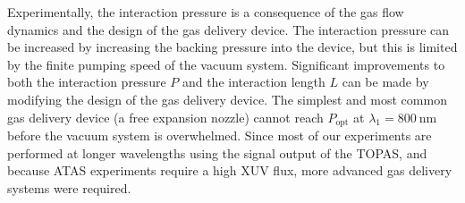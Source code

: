 Experimentally, the interaction pressure is a consequence of the gas flow dynamics and the design of the gas delivery device. The interaction pressure can be increased by increasing the backing pressure into the device, but this is limited by the finite pumping speed of the vacuum system. Significant improvements to both the interaction pressure $P$ and the interaction length $L$ can be made by modifying the design of the gas delivery device. The simplest and most common gas delivery device (a free expansion nozzle) cannot reach $P_{\textrm{opt}}$ at $\lambda_1 = 800 \ \textrm{nm}$ before the vacuum system is overwhelmed. Since most of our experiments are performed at longer wavelengths using the signal output of the TOPAS, and because ATAS experiments require a high XUV flux, more advanced gas delivery systems were required.



